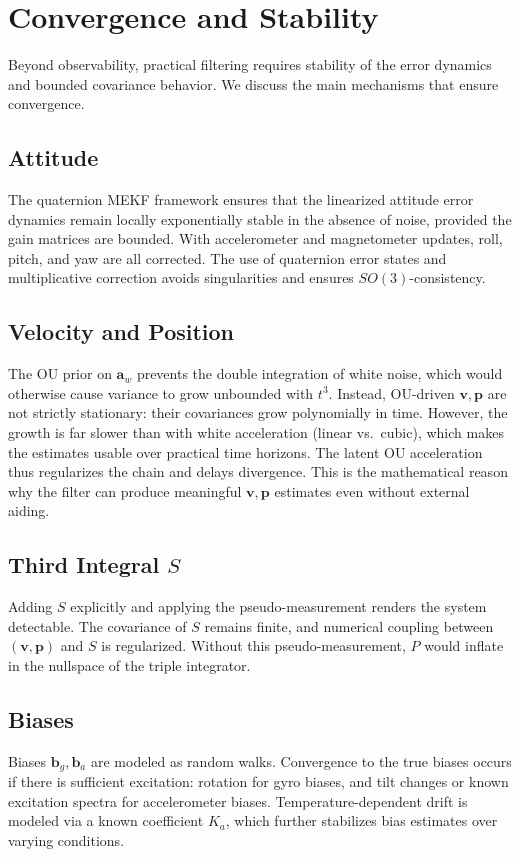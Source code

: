 \documentclass[10pt]{extarticle}
\begin{document}
\section{Convergence and Stability}
\label{sec:convergence}

Beyond observability, practical filtering requires stability of the error dynamics and
bounded covariance behavior. We discuss the main mechanisms that ensure convergence.

\subsection{Attitude}
The quaternion MEKF framework ensures that the linearized attitude error dynamics remain
locally exponentially stable in the absence of noise, provided the gain matrices are bounded.
With accelerometer and magnetometer updates, roll, pitch, and yaw are all corrected. The use
of quaternion error states and multiplicative correction avoids singularities and ensures
$SO(3)$-consistency.

\subsection{Velocity and Position}
The OU prior on $\bm a_w$ prevents the double integration of white noise, which would otherwise
cause variance to grow unbounded with $t^3$. Instead, OU-driven $\bm v,\bm p$ are not strictly stationary: their covariances grow polynomially in time. However, the growth is far slower than with white acceleration (linear vs.\ cubic), which makes the estimates usable over practical time horizons. The latent OU acceleration thus regularizes the chain and delays divergence. This is the mathematical reason
why the filter can produce meaningful $\bm v,\bm p$ estimates even without external aiding.

\subsection{Third Integral $S$}
Adding $S$ explicitly and applying the pseudo-measurement renders the system detectable. The
covariance of $S$ remains finite, and numerical coupling between $(\bm v,\bm p)$ and $S$ is
regularized. Without this pseudo-measurement, $P$ would inflate in the nullspace of the
triple integrator.

\subsection{Biases}
Biases $\bm b_g,\bm b_a$ are modeled as random walks. Convergence to
the true biases occurs if there is sufficient excitation: rotation for gyro biases, and tilt
changes or known excitation spectra for accelerometer biases. Temperature-dependent drift is
modeled via a known coefficient $K_a$, which further stabilizes bias estimates over varying
conditions.
\end{document}
